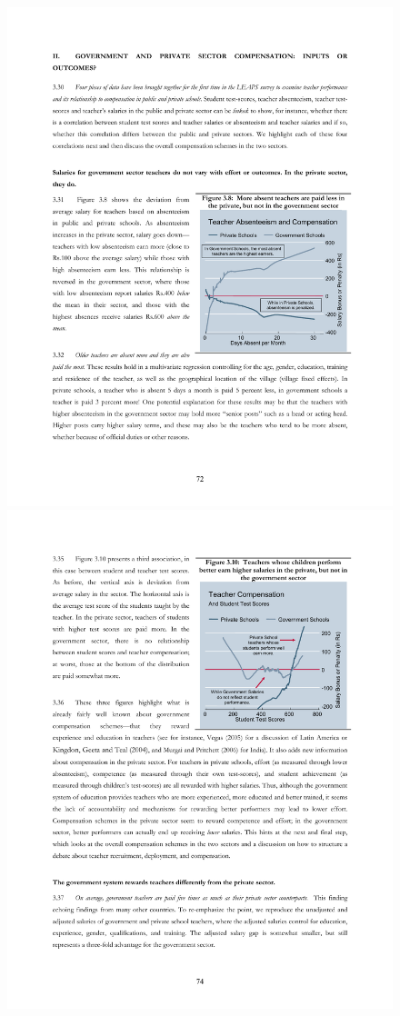 \documentclass[12pt]{article}
\begin{document}
\begin{figure}[htb]
	\begin{center}
	\caption{}\label{payandabsenteeism}
	\includegraphics[scale=0.82]{graphs/absenteeism_and_pay.pdf} \includegraphics[scale=0.8]{graphs/compensation_scores.pdf}

\end{center}
\end{figure}
\end{document}
